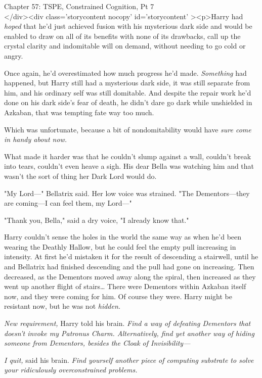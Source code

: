 
Chapter 57: TSPE, Constrained Cognition, Pt 7\\
</div><div  class='storycontent nocopy' id='storycontent' ><p>Harry had 
\emph{hoped} that he'd just achieved fusion with his mysterious dark side and 
would be enabled to draw on all of its benefits with none of its drawbacks, 
call up the crystal clarity and indomitable will on demand, without needing to 
go cold or angry.

Once again, he'd overestimated how much progress he'd made. \emph{Something} 
had happened, but Harry still had a mysterious dark side, it was still separate 
from him, and his ordinary self was still domitable. And despite the repair 
work he'd done on his dark side's fear of death, he didn't dare go dark while 
unshielded in Azkaban, that was tempting fate way too much.

Which was unfortunate, because a bit of nondomitability would have \emph{sure 
come in handy about now.}

What made it harder was that he couldn't slump against a wall, couldn't break 
into tears, couldn't even heave a sigh. His dear Bella was watching him and 
that wasn't the sort of thing her Dark Lord would do.

"My Lord---" Bellatrix said. Her low voice was strained. "The Dementors---they 
are coming---I can feel them, my Lord---"

"Thank you, Bella," said a dry voice, "I already know that."

Harry couldn't sense the holes in the world the same way as when he'd been 
wearing the Deathly Hallow, but he could feel the empty pull increasing in 
intensity. At first he'd mistaken it for the result of descending a stairwell, 
until he and Bellatrix had finished descending and the pull had gone on 
increasing. Then decreased, as the Dementors moved away along the spiral, then 
increased as they went up another flight of stairs{\ldots} There were Dementors 
within Azkaban itself now, and they were coming for him. Of course they were. 
Harry might be resistant now, but he was not \emph{hidden.}

\emph{New requirement,} Harry told his brain. \emph{Find a way of defeating 
Dementors that doesn't invoke my Patronus Charm. Alternatively, find yet 
another way of hiding someone from Dementors, besides the Cloak of 
Invisibility---}

\emph{I quit,} said his brain. \emph{Find yourself another piece of computing 
substrate to solve your ridiculously overconstrained problems.}


